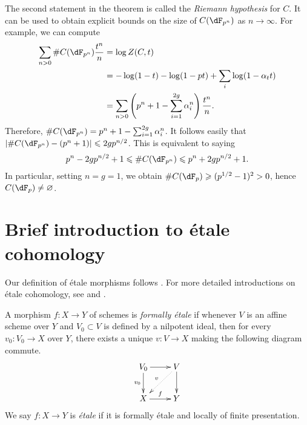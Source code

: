 \documentclass{article}
\begin{document}
The second statement in the theorem is called the \emph{Riemann hypothesis} 
for $C$. It can be used to obtain explicit bounds on the size of 
$C(\dF_{p^n})$ as $n\to\infty$. For example, we can compute 
\begin{align*}
  \sum_{n>0} \# C(\dF_{p^n}) \frac{t^n}{n} 
    &= \log Z(C,t) \\
    &= -\log(1-t) - \log(1-p t) + \sum_i \log(1-\alpha_t t) \\
    &= \sum_{n>0} \left(p^n+1-\sum_{i=1}^{2 g} \alpha_i^n\right) \frac{t^n}{n} \text{.}
\end{align*}
Therefore, $\# C(\dF_{p^n}) = p^n+1-\sum_{i=1}^{2 g} \alpha_i^n$. It 
follows easily that $|\# C(\dF_{p^n})-(p^n+1)| \leqslant 2 g p^{n/2}$. 
This is equivalent to saying 
\[
  p^n-2 g p^{n/2}+1 
    \leqslant \# C(\dF_{p^n}) 
    \leqslant p^n + 2 g p^{n/2} + 1 \text{.}
\]
In particular, setting $n = g = 1$, we obtain 
$\# C(\dF_p) \geqslant (p^{1/2}-1)^2>0$, hence 
$C(\dF_p)\ne\varnothing$. 













%
%










\appendix
\section{Brief introduction to \'etale cohomology}

Our definition of \'etale morphisms follows \cite[17.1]{ega4}. For more 
detailed introductions on \'etale cohomology, see \cite{mi-ec} and \cite{de77}. 





\begin{definition}
A morphism $f:X\to Y$ of schemes is \emph{formally \'etale} if whenever 
$V$ is an affine scheme over $Y$ and $V_0\subset V$ is defined by a nilpotent 
ideal, then for every $v_0:V_0 \to X$ over $Y$, there exists a unique 
$v:V\to X$ making the following diagram commute. 
\[\xymatrix{
  V_0 \ar[r] \ar[d]_-{v_0} 
    & V \ar[d] \ar@{.>}[dl]_-v \\
  X \ar[r]^-f 
    & Y
}\]
We say $f:X\to Y$ is \emph{\'etale} if it is formally \'etale and locally of 
finite presentation. 
\end{definition}
\end{document}
